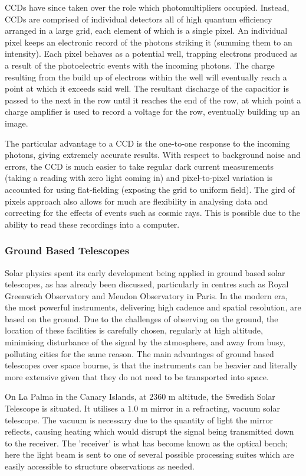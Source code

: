 CCDs have since taken over the role which photomultipliers occupied.
Instead, CCDs are comprised of individual detectors all of high quantum efficiency arranged in a large grid, each element of which is a single pixel.
An individual pixel keeps an electronic record of the photons striking it (summing them to an intensity).
Each pixel behaves as a potential well, trapping electrons produced as a result of the photoelectric events with the incoming photons.
The charge resulting from the build up of electrons within the well will eventually reach a point at which it exceeds said well.
The resultant discharge of the capacitior is passed to the next in the row until it reaches the end of the row, at which point a charge amplifier is used to record a voltage for the row, eventually building up an image.

The particular advantage to a CCD is the one-to-one response to the incoming photons, giving extremely accurate results.
With respect to background noise and errors, the CCD is much easier to take regular dark current measurements (taking a reading with zero light coming in) and pixel-to-pixel variation is accounted for using flat-fielding (exposing the grid to uniform field).
The gird of pixels approach also allows for much are flexibility in analysing data and correcting for the effects of events such as cosmic rays.
This is possible due to the ability to read these recordings into a computer.

\subsubsection{Ground Based Telescopes}

Solar physics spent its early development being applied in ground based solar telescopes, as has already been discussed, particularly in centres such as Royal Greenwich Observatory and Meudon Observatory in Paris.
In the modern era, the most powerful instruments, delivering high cadence and spatial resolution, are based on the ground.
Due to the challenges of observing on the ground, the location of these facilities is carefully chosen, regularly at high altitude, minimising disturbance of the signal by the atmosphere, and away from busy, polluting cities for the same reason.
The main advantages of ground based telescopes over space bourne, is that the instruments can be heavier and literally more extensive given that they do not need to be transported into space.

On La Palma in the Canary Islands, at $2360$ m altitude, the Swedish Solar Telescope is situated.
It utilises a $1.0$ m mirror in a refracting, vacuum solar telescope.
The vacuum is necessary due to the quantity of light the mirror reflects, causing heating which would disrupt the signal being transmitted down to the receiver.
The 'receiver' is what has become known as the optical bench; here the light beam is sent to one of several possible processing suites which are easily accessible to structure observations as needed.

